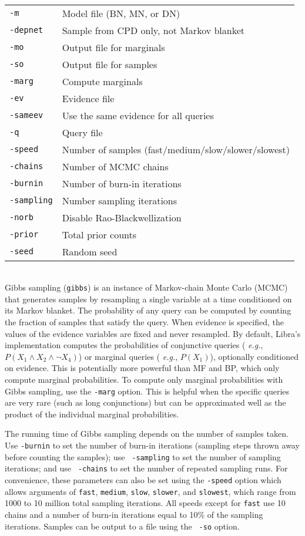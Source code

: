 \documentclass[11pt]{article}
\begin{document}
\noindent {} \\
\begin{tabular}{ll}
{\tt -m} &         Model file (BN, MN, or DN) \\
{\tt -depnet} &    Sample from CPD only, not Markov blanket \\
{\tt -mo} &        Output file for marginals \\
{\tt -so} &        Output file for samples \\
{\tt -marg} &      Compute marginals \\
{\tt -ev} &        Evidence file \\
{\tt -sameev} &    Use the same evidence for all queries \\
{\tt -q} &         Query file \\
{\tt -speed} &     Number of samples (fast/medium/slow/slower/slowest) \\
{\tt -chains} &    Number of MCMC chains \\
{\tt -burnin} &    Number of burn-in iterations \\
{\tt -sampling} &  Number sampling iterations \\
{\tt -norb} &      Disable Rao-Blackwellization \\
{\tt -prior} &     Total prior counts \\
{\tt -seed} &      Random seed \\
\end{tabular} \\

Gibbs sampling ({\tt gibbs}) is an instance of Markov-chain Monte
Carlo (MCMC) that generates samples by resampling a single variable at
a time conditioned on its Markov blanket.  The probability of any
query can be computed by counting the fraction of samples that satisfy
the query.  When evidence is specified, the values of the evidence
variables are fixed and never resampled.  By default, Libra's
implementation computes the probabilities of conjunctive queries ({\em
e.g.}, $P(X_1 \wedge X_2 \wedge \neg X_4)$) or marginal queries ({\em
e.g.}, $P(X_1)$), optionally conditioned on evidence.  This is
potentially more powerful than MF and BP, which only compute marginal
probabilities.  To compute only marginal probabilities with Gibbs
sampling, use the {\tt -marg} option.  This is helpful when the specific
queries are very rare (such as long conjunctions) but can be
approximated well as the product of the individual marginal
probabilities.

The running time of Gibbs sampling depends on the number of samples
taken.  Use {\tt -burnin} to set the number of burn-in iterations
(sampling steps thrown away before counting the samples); use {\tt
-sampling} to set the number of sampling iterations; and use {\tt
-chains} to set the number of repeated sampling runs.  For
convenience, these parameters can also be set using the {\tt -speed}
option which allows arguments of {\tt fast}, {\tt medium}, {\tt slow},
{\tt slower}, and {\tt slowest}, which range from 1000 to 10 million
total sampling iterations.  All speeds except for {\tt fast} use 10
chains and a number of burn-in iterations equal to 10\% of the
sampling iterations. Samples can be output to a file using the {\tt
-so} option.
\end{document}
